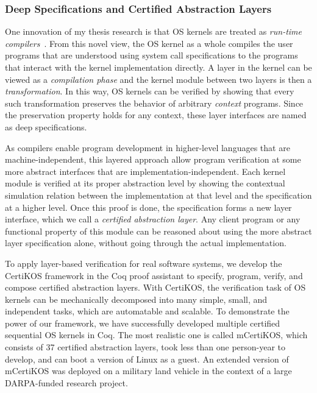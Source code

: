 \documentclass[a4paper, 10pt]{article}
\begin{document}
\begin{small}
\subsubsection*{\small Deep Specifications and Certified Abstraction Layers}
\begin{comment}
Modern OS kernels are designed and constructed using a
stack of \emph{abstraction layers},
each of which defines an interface that hides the underlying implementation
details. Client programs can be understood solely based on the interface,
independent of the layer implementation. Despite their huge contributions
to the computer industry,
abstraction layers have mostly been treated as a system
concept; before our work, they have almost never been formally specified or verified.
\end{comment}
One innovation of my thesis research is that  OS kernels are treated as \emph{run-time compilers}~\cite{popl15-gu}.
From this novel view,
the OS kernel as a whole compiles the
user programs that are understood using system call specifications  to the programs that interact 
with the kernel implementation directly.
A layer in the kernel can be viewed as a \emph{compilation phase}
and the kernel module between two layers  is then a \emph{transformation}.
In this way,  OS kernels can be verified by showing that
every such transformation
preserves the behavior of arbitrary \emph{context} programs.
Since the preservation property holds for any context,
these layer interfaces are named
as deep specifications. 


As compilers enable program development
in higher-level languages that are machine-independent,
this layered approach allow program verification 
at some more abstract interfaces that are implementation-independent. Each kernel module is verified
at its proper abstraction level by showing the contextual
simulation relation between the implementation at that level
and the specification at a higher level.
Once this proof is done, the specification forms a new layer interface, which we call a \emph{certified abstraction layer}.
Any client program or any functional property of this module
can be reasoned about using the more abstract  layer specification alone, without going through the actual implementation.

To apply layer-based verification for real software systems,
we develop the CertiKOS framework in the Coq proof assistant
to specify, program, verify, and compose certified abstraction
layers. With CertiKOS, the verification task of OS kernels
can be mechanically decomposed into many simple, small, and
independent tasks, which are automatable and scalable.
To demonstrate the power of our framework,
 we have successfully developed multiple certified
sequential OS kernels in Coq. 
The most realistic one is called mCertiKOS,
which consists of 37 certified abstraction layers, 
took less than one person-year to develop,
and can boot a version of Linux as a guest.
An extended version of mCertiKOS was deployed on a military land vehicle in the context of a large DARPA-funded research project.


\end{small}
\end{document}
